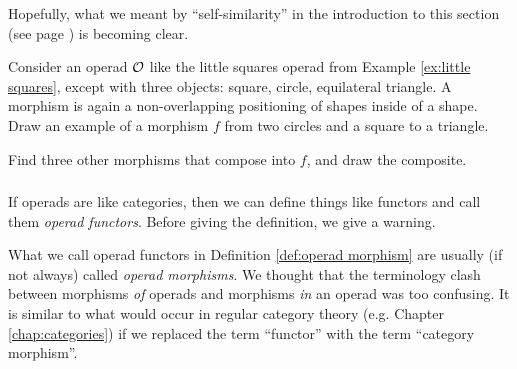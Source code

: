 \begin{example}
Hopefully, what we meant by “self-similarity” in the introduction to this section (see page \pageref{sec:operad}) is becoming clear.

\end{example}

\begin{exercise}\label{exc:little shapes}
Consider an operad $\mathcal{O}$ like the little squares operad from Example \ref{ex:little squares}, except with three objects: square, circle, equilateral triangle. A morphism is again a non-overlapping positioning of shapes inside of a shape. 
\sexc Draw an example of a morphism $f$ from two circles and a square to a triangle.
\item Find three other morphisms that compose into $f$, and draw the composite.
\endsexc
\end{exercise}


\subsubsection{}

If operads are like categories, then we can define things like functors and call them {\em operad functors}. Before giving the definition, we give a warning.

\begin{warning}

What we call operad functors in Definition \ref{def:operad morphism} are usually (if not always) called {\em operad morphisms}. We thought that the terminology clash between morphisms {\em of} operads and morphisms {\em in} an operad was too confusing. It is similar to what would occur in regular category theory (e.g. Chapter \ref{chap:categories}) if we replaced the term “functor” with the term “category morphism”. 

\end{warning}

